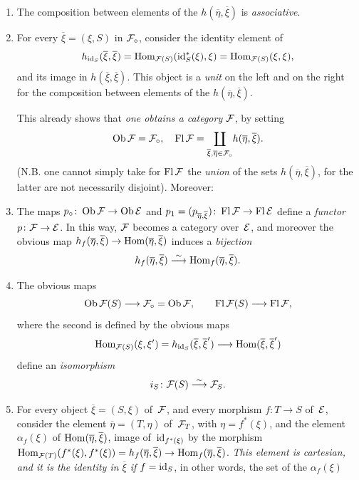 \begin{enumerate}
\item[1)] The composition between elements of the
$h(\overline{\eta},\overline{\xi})$
is \emph{associative}.
\item[2)]
For every $\overline{\xi}=(\xi,S)$ in $\cal{F}_\circ$,
consider the identity element
of
$$
h_{\id_S}(\overline{\xi},\overline{\xi})=
\Hom_{\cal{F}(S)}(\id_S^*(\xi),\xi)=\Hom_{\cal{F}(S)}(\xi,\xi),
$$
and its image in $h(\overline{\xi},\overline{\xi})$. This object is
a \emph{unit} on the left and on the right for the composition
between elements of the $h(\overline{\eta},\overline{\xi})$.

This already shows that \emph{one obtains a category}
$\cal{F}$, by setting
$$
\Ob\cal{F}=\cal{F}_\circ,\quad \Fl{\cal{F}}=
\underset{\overline{\xi},\overline{\eta}\in\cal{F}_\circ}
\coprod h(\overline{\eta},\overline{\xi}).
$$
(N.B. one cannot simply take for $\Fl\cal{F}$ the
\emph{union} of the sets $h(\overline{\eta},\overline{\xi})$,
for the latter are not necessarily disjoint). Moreover:
\item[3)] The maps $p_\circ\colon \Ob\cal{F}\to\Ob\cal{E}$ and
$p_1=(p_{\overline{\eta},\overline{\xi}})\colon\Fl\cal{F}\to\Fl{\cal{E}}$
define a \emph{functor} $p\colon\cal{F}\to\cal{E}$. In
this way, $\cal{F}$ becomes a category over~$\cal{E}$, and
moreover the obvious map
$h_f(\overline{\eta},\overline{\xi})\to\Hom(\overline{\eta},\overline{\xi})$
induces a \emph{bijection}
$$
h_f(\overline{\eta},\overline{\xi})\isomto
\Hom_f(\overline{\eta},\overline{\xi}).
$$
\item[4)] The obvious maps
$$ \Ob\cal{F}(S)\to\cal{F}_\circ=\Ob\cal{F},\qquad \Fl\cal{F}(S)\to
\Fl\cal{F},
$$
where the second is defined by the obvious
maps
$$
\Hom_{\cal{F}(S)}(\xi,\xi')=
h_{\id_S}(\overline{\xi},\overline{\xi}')\to
\Hom(\overline{\xi},\overline{\xi}')
$$
define an \emph{isomorphism}
$$
i_S \colon \cal{F}(S)\isomto\cal{F}_S.
$$
\item[5)] For every object $\overline{\xi}=(S,\xi)$ of~$\cal{F}$, and
every morphism $f\colon T\to S$ of~$\cal{E}$, consider
the element $\overline{\eta}=(T,\eta)$ of~$\cal{F}_T$, with
$\eta=f^*(\xi)$, and the element $\alpha_f(\xi)$ of
$\Hom(\overline{\eta},\overline{\xi})$, image of~$\id_{f^*(\xi)}$ by
the morphism
$\Hom_{\cal{F}(T)}(f^*(\xi),f^*(\xi))=h_f(\overline{\eta},\overline{\xi})
\to \Hom_f(\overline{\eta},\overline{\xi})$. \emph{This element
is cartesian, and it is the identity in $\overline{\xi}$ if}
$f=\id_S$, in other words, the set of the $\alpha_f(\xi)$

\end{enumerate}
